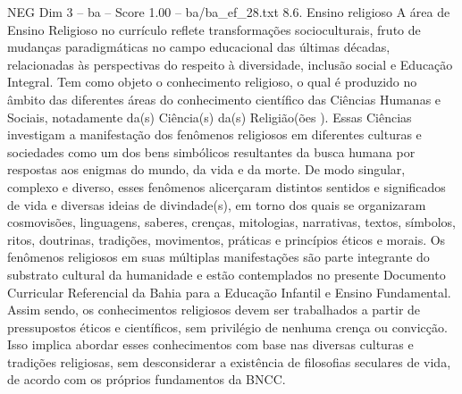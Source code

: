 \begin{textsample}{NEG Dim 3 – ba – Score 1.00 – ba/ba\_ef\_28.txt}  \label{ex:f3_neg_114}
8.6.
Ensino religioso A área de Ensino Religioso no currículo reflete transformações socioculturais, fruto de mudanças paradigmáticas no campo educacional das últimas décadas, relacionadas às perspectivas do respeito à diversidade, inclusão social e Educação Integral.
Tem como objeto o conhecimento religioso, o qual é produzido no âmbito das diferentes áreas do conhecimento científico das Ciências Humanas e Sociais, notadamente da(s) Ciência(s) da(s) Religião(ões ).
Essas Ciências investigam a manifestação dos fenômenos religiosos em diferentes culturas e sociedades como um dos bens simbólicos resultantes da busca humana por respostas aos enigmas do mundo, da vida e da morte.
De modo singular, complexo e diverso, esses fenômenos alicerçaram distintos sentidos e significados de vida e diversas ideias de divindade(s), em torno dos quais se organizaram cosmovisões, linguagens, saberes, crenças, mitologias, narrativas, textos, símbolos, ritos, doutrinas, tradições, movimentos, práticas e princípios éticos e morais.
Os fenômenos religiosos em suas múltiplas manifestações são parte integrante do substrato cultural da humanidade e estão contemplados no presente Documento Curricular Referencial da Bahia para a Educação Infantil e Ensino Fundamental.
Assim sendo, os conhecimentos religiosos devem ser trabalhados a partir de pressupostos éticos e científicos, sem privilégio de nenhuma crença ou convicção.
Isso implica abordar esses conhecimentos com base nas diversas culturas e tradições religiosas, sem desconsiderar a existência de filosofias seculares de vida, de acordo com os próprios fundamentos da BNCC.

\end{textsample}
